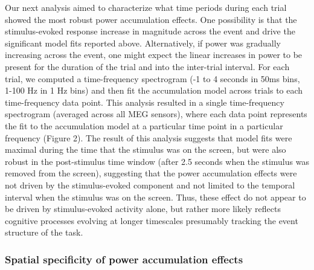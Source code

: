 Our next analysis aimed to characterize what time periods during each
trial showed the most robust power accumulation effects. One possibility
is that the stimulus-evoked response increase in magnitude across the
event and drive the significant model fits reported above.
Alternatively, if power was gradually increasing across the event, one
might expect the linear increases in power to be present for the
duration of the trial and into the inter-trial interval. For each trial,
we computed a time-frequency spectrogram (-1 to 4 seconds in 50ms bins,
1-100 Hz in 1 Hz bins) and then fit the accumulation model across trials
to each time-frequency data point. This analysis resulted in a single
time-frequency spectrogram (averaged across all MEG sensors), where each
data point represents the fit to the accumulation model at a particular
time point in a particular frequency (Figure 2). The result of this
analysis suggests that model fits were maximal during the time that the
stimulus was on the screen, but were also robust in the post-stimulus
time window (after 2.5 seconds when the stimulus was removed from the
screen), suggesting that the power accumulation effects were not driven
by the stimulus-evoked component and not limited to the temporal
interval when the stimulus was on the screen. Thus, these effect do not
appear to be driven by stimulus-evoked activity alone, but rather more
likely reflects cognitive processes evolving at longer timescales
presumably tracking the event structure of the task.

\subsubsection{Spatial specificity of power accumulation
effects}\label{spatial-specificity-of-power-accumulation-effects}

